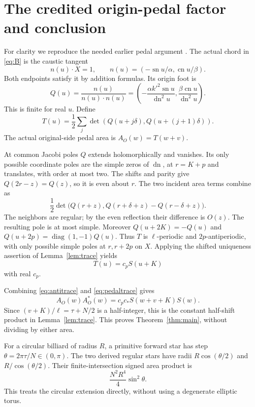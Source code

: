 \documentclass[11pt,letterpaper]{article}
\DeclareMathOperator{\sn}{sn}
\DeclareMathOperator{\cn}{cn}
\DeclareMathOperator{\dn}{dn}
\begin{document}
\section{The credited origin-pedal factor and conclusion}
For clarity we reproduce the needed earlier pedal argument
\cite{pedal}. The actual chord in \eqref{eq:B} is the caustic tangent
\[
 n(u)\cdot X=1,\qquad n(u)=(-\sn u/\alpha,\cn u/\beta).
\]
Both endpoints satisfy it by addition formulas. Its origin foot is
\begin{equation}\label{eq:foot}
 Q(u)=\frac{n(u)}{n(u)\cdot n(u)}
   =\left(-\frac{\alpha k'^2\sn u}{\dn^2u},
                  \frac{\beta\cn u}{\dn^2u}\right).
\end{equation}
This is finite for real $u$. Define
\[
 T(u)=\frac12\sum_j\det(Q(u+j\delta),Q(u+(j+1)\delta)).
\]
The actual original-side pedal area is $A_O(w)=T(w+v)$.

At common Jacobi poles $Q$ extends holomorphically and vanishes.
Its only possible coordinate poles are the simple zeros of $\dn$,
at $r=K+p$ and translates, with order at most two.
The shifts and parity give $Q(2r-z)=Q(z)$, so it is even about $r$.
The two incident area terms combine as
\[
 \frac12\det\bigl(Q(r+z),
                   Q(r+\delta+z)-Q(r-\delta+z)\bigr).
\]
The neighbors are regular; by the even reflection their difference
is $O(z)$. The resulting pole is at most simple.
Moreover $Q(u+2K)=-Q(u)$ and
$Q(u+2p)=\operatorname{diag}(1,-1)Q(u)$.
Thus $T$ is $\ell$-periodic and $2p$-antiperiodic, with only possible
simple poles at $r,r+2p$ on $X$. Applying the shifted uniqueness
assertion of Lemma~\ref{lem:trace} yields
\begin{equation}\label{eq:pedaltrace}
 T(u)=c_pS(u+K)
\end{equation}
with real $c_p$.

Combining \eqref{eq:antitrace} and \eqref{eq:pedaltrace} gives
\[
 A_O(w)A_O^*(w)=c_pc_*S(w+v+K)S(w).
\]
Since $(v+K)/\ell=\tau+N/2$ is a half-integer,
this is the constant half-shift product in Lemma~\ref{lem:trace}.
This proves Theorem~\ref{thm:main}, without dividing by either area.

For a circular billiard of radius $R$, a primitive forward star has
step $\theta=2\pi\tau/N\in(0,\pi)$. The two derived regular stars
have radii $R\cos(\theta/2)$ and $R/\cos(\theta/2)$.
Their finite-intersection signed area product is
\[
 \frac{N^2R^4}{4}\sin^2\theta.
\]
This treats the circular extension directly, without using a
degenerate elliptic torus.
\end{document}
